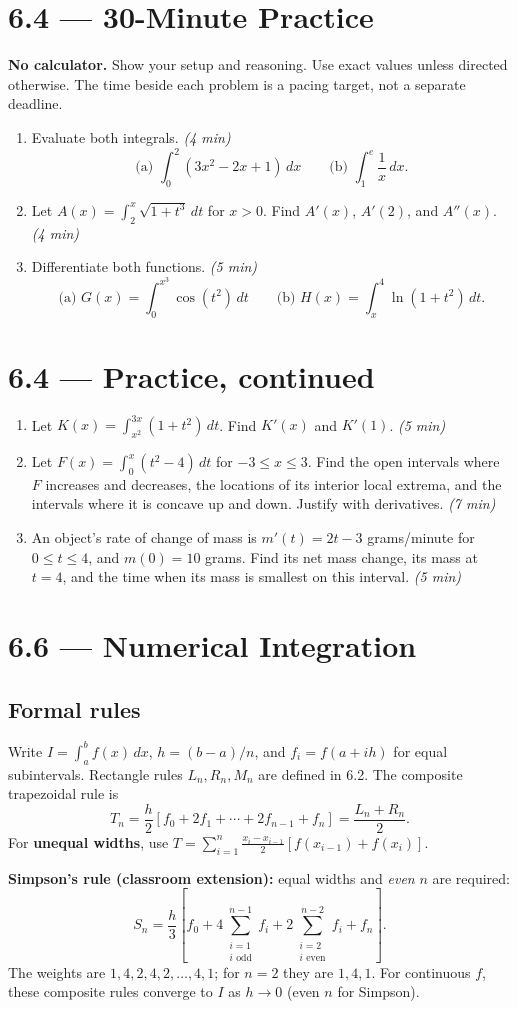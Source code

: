 \documentclass[11pt]{article}
\newcommand{\topic}[2]{\clearpage\section*{#1 --- #2}}
\newcommand{\practice}[2]{\clearpage\section*{#1 --- 30-Minute Practice}\textbf{#2} Show your setup and reasoning. Use exact values unless directed otherwise. The time beside each problem is a pacing target, not a separate deadline.}
\newcommand{\continued}[1]{\clearpage\section*{#1 --- Practice, continued}}
\newcommand{\mins}[1]{\hfill\textit{(#1 min)}}
\newcommand{\dx}{\,dx}
\begin{document}
\practice{6.4}{No calculator.}
\begin{enumerate}
\item Evaluate both integrals. \mins{4}
\[
\text{(a) }\int_0^2(3x^2-2x+1)\dx\qquad
\text{(b) }\int_1^e\frac1x\dx.
\]
\vfill
\item Let $A(x)=\int_2^x\sqrt{1+t^3}\,dt$ for $x>0$.
Find $A'(x)$, $A'(2)$, and $A''(x)$. \mins{4}
\vfill
\item Differentiate both functions. \mins{5}
\[
\text{(a) }G(x)=\int_0^{x^3}\cos(t^2)\,dt\qquad
\text{(b) }H(x)=\int_x^4\ln(1+t^2)\,dt.
\]
\vfill
\end{enumerate}
\continued{6.4}
\begin{enumerate}[start=4]
\item Let $K(x)=\int_{x^2}^{3x}(1+t^2)\,dt$. Find $K'(x)$ and $K'(1)$. \mins{5}
\vfill
\item Let $F(x)=\int_0^x(t^2-4)\,dt$ for $-3\le x\le3$.
Find the open intervals where $F$ increases and decreases, the locations of its interior local extrema, and the intervals where it is concave up and down. Justify with derivatives. \mins{7}
\vfill
\item An object's rate of change of mass is $m'(t)=2t-3$ grams/minute for $0\le t\le4$, and $m(0)=10$ grams.
Find its net mass change, its mass at $t=4$, and the time when its mass is smallest on this interval. \mins{5}
\vfill
\end{enumerate}

\topic{6.6}{Numerical Integration}
\subsection*{Formal rules}
Write $I=\int_a^b f(x)\dx$, $h=(b-a)/n$, and $f_i=f(a+ih)$ for equal subintervals.
Rectangle rules $L_n,R_n,M_n$ are defined in 6.2. The composite trapezoidal rule is
\[
T_n=\frac h2[f_0+2f_1+\cdots+2f_{n-1}+f_n]
=\frac{L_n+R_n}{2}.
\]
For \textbf{unequal widths}, use
$T=\sum_{i=1}^n\frac{x_i-x_{i-1}}2[f(x_{i-1})+f(x_i)]$.

\textbf{Simpson's rule (classroom extension):} equal widths and \emph{even} $n$ are required:
\[
S_n=\frac h3\left[f_0+
4\sum_{\substack{i=1\\i\text{ odd}}}^{n-1}f_i+
2\sum_{\substack{i=2\\i\text{ even}}}^{n-2}f_i+f_n\right].
\]
The weights are $1,4,2,4,2,\ldots,4,1$; for $n=2$ they are $1,4,1$.
For continuous $f$, these composite rules converge to $I$ as $h\to0$ (even $n$ for Simpson).
\end{document}
